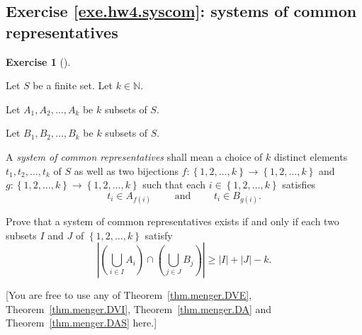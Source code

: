 \documentclass[numbers=enddot,12pt,final,onecolumn,notitlepage]{scrartcl}%
\newcounter{exer}
\theoremstyle{definition}
\newtheorem{exmp}[exer]{Exercise}
\newenvironment{exercise}[1][]
{\begin{exmp}[#1]\begin{leftbar}}
{\end{leftbar}\end{exmp}}
\let\cupnonlimits\bigcup
\renewcommand{\bigcup}{\cupnonlimits\limits}
\newcommand{\NN}{\mathbb{N}}
\newcommand{\set}[1]{\left\{ #1 \right\}}
\newcommand{\abs}[1]{\left| #1 \right|}
\newcommand{\tup}[1]{\left( #1 \right)}
\begin{document}
\subsection{Exercise \ref{exe.hw4.syscom}: systems of common
representatives}

\begin{exercise} \label{exe.hw4.syscom}
Let $S$ be a finite set. Let $k \in \NN$.

Let $A_1, A_2, \ldots, A_k$ be $k$ subsets of $S$.

Let $B_1, B_2, \ldots, B_k$ be $k$ subsets of $S$.

A \textit{system of common representatives} shall mean a
choice of $k$ distinct elements $t_1, t_2, \ldots, t_k$ of
$S$ as well as two bijections
$f : \set{1, 2, \ldots, k} \to \set{1, 2, \ldots, k}$
and
$g : \set{1, 2, \ldots, k} \to \set{1, 2, \ldots, k}$
such that each $i \in \set{1, 2, \ldots, k}$ satisfies
\[
 t_i \in A_{f\tup{i}}
 \qquad \text{ and } \qquad
 t_i \in B_{g\tup{i}} .
\]

Prove that a system of common representatives exists if and only
if each two subsets $I$ and $J$ of $\set{1, 2, \ldots, k}$
satisfy
\[
 \abs{\tup{\bigcup_{i \in I} A_i} \cap \tup{\bigcup_{j \in J} B_j}}
 \geq \abs{I} + \abs{J} - k .
\]

[You are free to use any of
Theorem~\ref{thm.menger.DVE},
Theorem~\ref{thm.menger.DVI}, Theorem~\ref{thm.menger.DA} and
Theorem~\ref{thm.menger.DAS} here.]
\end{exercise}
\end{document}
